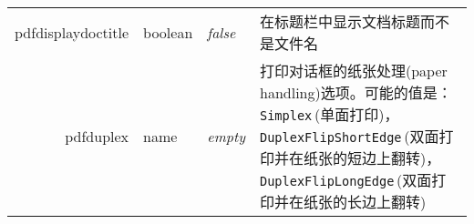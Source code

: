 \documentclass{article}
\begin{document}
\begin{longtable}{@{}>{\ttfamily}r>{\raggedright}p{}>{\itshape}lp{7cm}@{}}
  pdfdisplaydoctitle  & boolean        & false                     & 在标题栏中显示文档标题而不是文件名                                                                                                                                                                                                            \\
  pdfduplex           & name           & empty                     & 打印对话框的纸张处理(paper handling)选项。可能的值是：
  \verb|Simplex|\,(单面打印)，
  \verb|DuplexFlipShortEdge|\,(双面打印并在纸张的短边上翻转)，
  \verb|DuplexFlipLongEdge|\,(双面打印并在纸张的长边上翻转)                                                                                                                                                                                                                                                     \\


\end{longtable}
\end{document}
